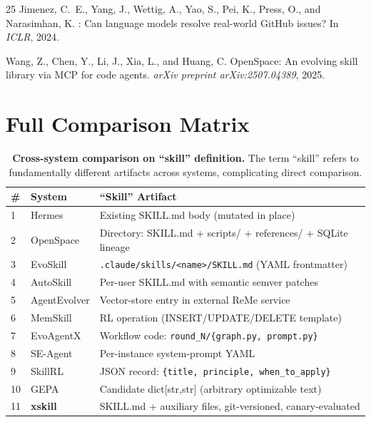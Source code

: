 \documentclass[11pt]{article}
\begin{document}
\begin{thebibliography}{25}
Jimenez, C.~E., Yang, J., Wettig, A., Yao, S., Pei, K., Press, O., and Narasimhan, K.
: Can language models resolve real-world {GitHub} issues?
\newblock In \emph{ICLR}, 2024.

Wang, Z., Chen, Y., Li, J., Xia, L., and Huang, C.
\newblock OpenSpace: An evolving skill library via {MCP} for code agents.
\newblock \emph{arXiv preprint arXiv:2507.04389}, 2025.

\end{thebibliography}

\newpage
\appendix

\section{Full Comparison Matrix}
\label{app:matrix}

\begin{table}[h!]
\centering
\caption{\textbf{Cross-system comparison on ``skill'' definition.} The term ``skill'' refers to fundamentally different artifacts across systems, complicating direct comparison.}
\label{tab:skill-def}
\small
\begin{tabular}{@{}llp{6cm}@{}}
\toprule
\textbf{\#} & \textbf{System} & \textbf{``Skill'' Artifact} \\
\midrule
1 & Hermes & Existing SKILL.md body (mutated in place) \\
2 & OpenSpace & Directory: SKILL.md + scripts/ + references/ + SQLite lineage \\
3 & EvoSkill & \texttt{.claude/skills/<name>/SKILL.md} (YAML frontmatter) \\
4 & AutoSkill & Per-user SKILL.md with semantic semver patches \\
5 & AgentEvolver & Vector-store entry in external ReMe service \\
6 & MemSkill & RL operation (INSERT/UPDATE/DELETE template) \\
7 & EvoAgentX & Workflow code: \texttt{round\_N/\{graph.py, prompt.py\}} \\
8 & SE-Agent & Per-instance system-prompt YAML \\
9 & SkillRL & JSON record: \texttt{\{title, principle, when\_to\_apply\}} \\
10 & GEPA & Candidate dict[str,str] (arbitrary optimizable text) \\
\midrule
11 & \textbf{xskill} & SKILL.md + auxiliary files, git-versioned, canary-evaluated \\
\bottomrule
\end{tabular}
\end{table}
\end{document}
